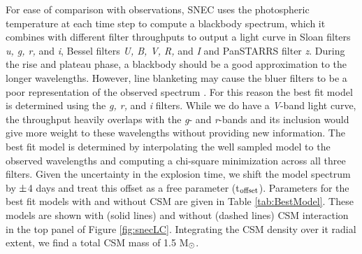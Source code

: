 \documentclass[a4paper,fleqn,usenatbib]{mnras}
\newcommand{\msunperiod}{M$\rm{_{\odot}}$}
\begin{document}
For ease of comparison with observations, SNEC uses the photospheric temperature at each time step to compute a blackbody spectrum, which it combines with different filter throughputs to output a light curve in Sloan filters {\it u, g, r,} and {\it i}, Bessel filters {\it U, B, V, R,} and {\it I} and PanSTARRS filter {\it z}. 
During the rise and plateau phase, a blackbody should be a good approximation to the longer wavelengths. 
However, line blanketing may cause the bluer filters to be a poor representation of the observed spectrum \citep{2009kasen,2005dessart}.
For this reason the best fit model is determined using the {\it g, r,} and {\it i} filters. 
While we do have a {\it V}-band light curve, the throughput heavily overlaps with the {\it g}- and {\it r}-bands and its inclusion would give more weight to these wavelengths without providing new information.
The best fit model is determined by interpolating the well sampled model to the observed wavelengths and computing a chi-square minimization across all three filters.
Given the uncertainty in the explosion time, we shift the model spectrum by $\rm{\pm}$4 days and treat this offset as a free parameter (t$\rm{_{offset}}$).
Parameters for the best fit models with and without CSM are given in Table \ref{tab:BestModel}. 
These models are shown with (solid lines) and without (dashed lines) CSM interaction in the top panel of Figure \ref{fig:snecLC}. 
Integrating the CSM density over it radial extent, we find a total CSM mass of 1.5 \msunperiod. 
\end{document}
